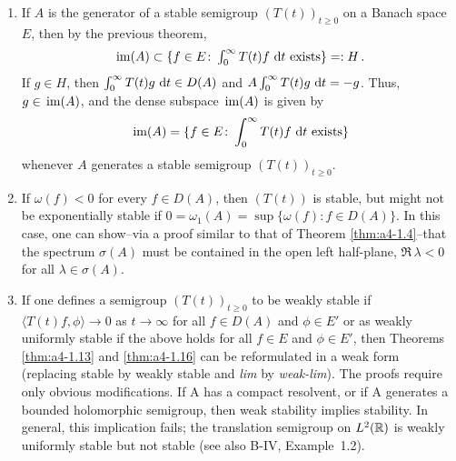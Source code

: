 \begin{remark}\label{rem:a4-1.17}
\begin{enumerate}[\upshape (i), wide, labelsep=1em]
\item 
If $A$ is the generator of a stable semigroup
$(T(t))_{t \geq 0}$ on a Banach space $E$, then by the previous theorem,
\[\textstyle{
\mathop{}\mathrm{im}(A) \subset \{f \in E\colon\int_{0}^{\infty} T(t)f \,\mathop{}\!\mathrm{d}{t}\text{ exists}\} =: H\,.
}\]
If $g \in H$, then $\int_{0}^{\infty} T(t)g \,\mathop{}\!\mathrm{d}{t} \in D(A)$ and $A \int_{0}^{\infty} T(t)g \,\mathop{}\!\mathrm{d}{t} = -g$. 
Thus, $g \in \mathop{}\mathrm{im}(A)$, and  the dense subspace $\mathop{}\mathrm{im}(A)$ is given
by
\begin{equation}\label{eq:a4-1.14}
\mathop{}\mathrm{im}(A) = \{f \in E\colon\int_{0}^{\infty} T(t)f \,\mathop{}\!\mathrm{d}{t} \text{ exists}\}
\end{equation}
whenever $A$ generates a stable semigroup $(T(t))_{t \geq 0}$.

\item 
If $\omega(f) < 0$ for every $f \in D(A)$, then $(T(t))$ is stable, but
might not be exponentially stable if
$0 = \omega_{1}(A) = \sup\{\omega(f) \colon f \in D(A)\}$. 
In this case, one can show--via a
proof similar to that of Theorem \ref{thm:a4-1.4}--that the spectrum $\sigma(A)$ must be contained
in the open left half-plane, \ie $\Re\,\lambda < 0$ for all $\lambda \in \sigma(A)$.

\item 
If one defines a semigroup $(T(t))_{t \geq 0}$ to be weakly stable if
$\langle T(t)f,\phi \rangle \to 0$ as $t \to \infty$ for all $f \in D(A)$ and $\phi \in E'$ or as
weakly uniformly stable if the above holds  for all $f \in E$
and $\phi \in E'$, then Theorems \ref{thm:a4-1.13} and \ref{thm:a4-1.16} can be reformulated in a weak form (\ie  replacing stable by weakly stable and \emph{lim} by
\emph{weak-lim}). 
The proofs require only obvious modifications.
If A has a compact resolvent, or if A generates a bounded
holomorphic semigroup, then weak stability implies stability. 
In general, this implication fails; \eg the translation semigroup on
$L^{2}(\mathbb{R})$ is weakly uniformly stable but not stable (see also B-IV, Example~1.2).
\end{enumerate}
\end{remark}
